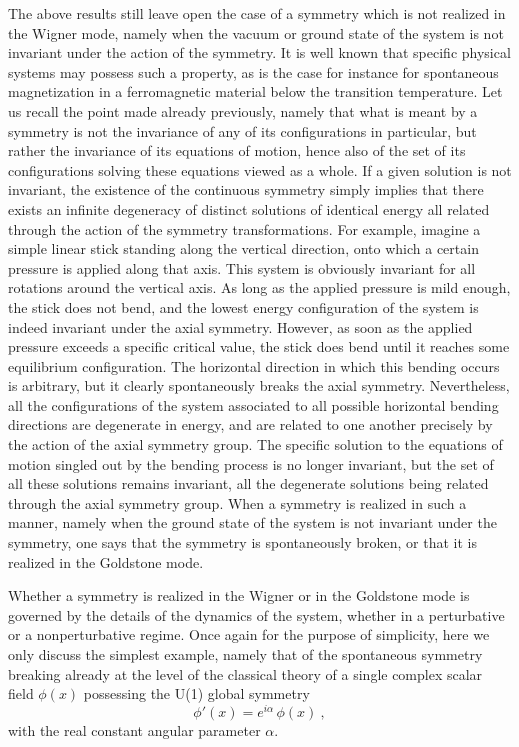 \documentclass[a4paper,11pt]{article}
\begin{document}
The above results still leave open the case of a symmetry which is not
realized in the Wigner mode, namely when the vacuum or ground state of the
system is not invariant under the action of the symmetry. It is well known 
that specific physical systems may possess such a property, as is the case
for instance for spontaneous magnetization in a ferromagnetic material
below the transition temperature. Let us recall the point made already
previously, namely that what is meant by a symmetry is not the invariance of
any of its configurations in particular, but rather the invariance of its 
equations of motion, hence also of the set of its configurations solving 
these equations viewed as a whole. If a given solution is not invariant, 
the existence of the continuous symmetry simply implies that there exists 
an infinite degeneracy of distinct solutions of identical energy all related 
through the action of the symmetry transformations. For example, imagine a 
simple linear stick standing along the vertical direction, onto which a 
certain pressure is applied along that axis. This system is obviously 
invariant for all rotations around the vertical axis. As long as the applied 
pressure is mild enough, the stick does not bend, and the lowest energy 
configuration of the system is indeed invariant under the axial symmetry. 
However, as soon as the applied pressure exceeds a specific critical value, 
the stick does bend until it reaches some equilibrium con\-fi\-gu\-ra\-tion. 
The horizontal direction in which this bending occurs is arbitrary, but it 
clearly spontaneously breaks the axial symmetry. Nevertheless, all the 
configurations of the system associated to all possible horizontal bending 
directions are degenerate in energy, and are related to one another precisely 
by the action of the axial symmetry group. The specific solution to the 
equations of motion singled out by the bending process is no longer 
invariant, but the set of all these solutions remains invariant, all the 
degenerate solutions being related through the axial symmetry group. When 
a symmetry is realized in such a manner, namely when the ground state of 
the system is not invariant under the symmetry, one says that the symmetry 
is spontaneously broken, or that it is realized in the Goldstone mode.

Whether a symmetry is realized in the Wigner or in the Goldstone mode
is governed by the details of the dynamics of the system, whether in
a perturbative or a nonperturbative regime. Once again for the purpose of
simplicity, here we only discuss the simplest example, namely that
of the spontaneous symmetry breaking already at the level of the classical
theory of a single complex scalar field $\phi(x)$ possessing the U(1) 
global symmetry
\begin{equation}
\phi'(x)=e^{i\alpha}\,\phi(x)\ ,
\end{equation}
with the real constant angular parameter $\alpha$.
\end{document}
